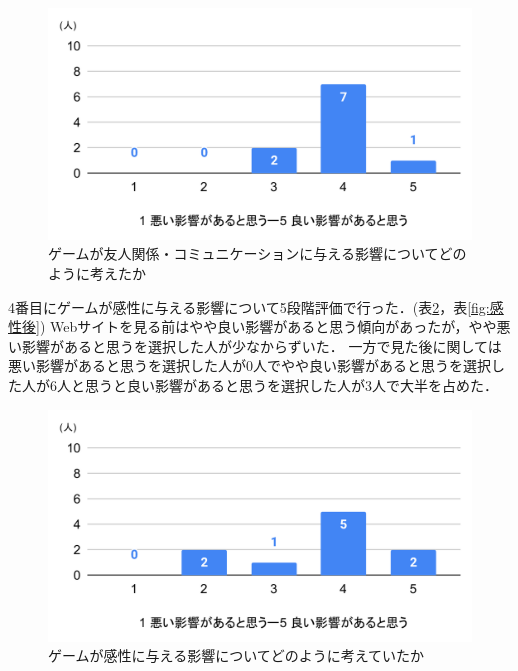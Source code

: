 \documentclass[12pt,a4j,titlepage]{ltjsarticle}
\begin{document}
\begin{figure}[H]
 \begin{center}
  \includegraphics[keepaspectratio, scale=0.5]{コミュ後.pdf}
 \end{center}
 \caption{ゲームが友人関係・コミュニケーションに与える影響についてどのように考えたか}
 \label{fig:コミュ後}
\end{figure}

4番目にゲームが感性に与える影響について5段階評価で行った．(表\ref{fig:感性前}，表\ref{fig:感性後})
Webサイトを見る前はやや良い影響があると思う傾向があったが，やや悪い影響があると思うを選択した人が少なからずいた．
一方で見た後に関しては悪い影響があると思うを選択した人が0人でやや良い影響があると思うを選択した人が6人と思うと良い影響があると思うを選択した人が3人で大半を占めた．

\begin{figure}[H]
 \begin{center}
  \includegraphics[keepaspectratio, scale=0.5]{感性前.pdf}
 \end{center}
 \caption{ゲームが感性に与える影響についてどのように考えていたか}
 \label{fig:感性前}
\end{figure}
\end{document}
